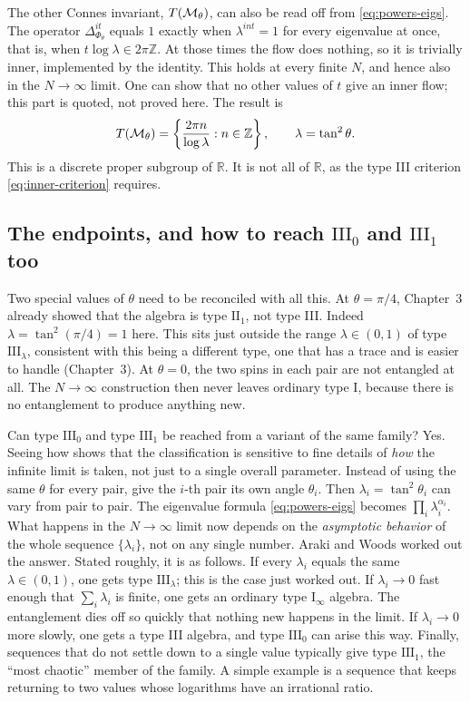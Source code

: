 The other Connes invariant, $T(\mathcal{M}_\theta)$, can also be read off from \eqref{eq:powers-eigs}. The operator
$\Delta_{\Phi_\theta}^{it}$ equals $1$ exactly when $\lambda^{int}=1$ for every eigenvalue at once, that is,
when $t\log\lambda\in2\pi\mathbb Z$. At those times the flow does nothing, so it is trivially inner,
implemented by the identity. This holds at every finite $N$, and hence also in the $N\to\infty$ limit. One can
show that no other values of $t$ give an inner flow; this part is quoted, not proved here. The result is
\[
T(\mathcal{M}_\theta) = \left\{\frac{2\pi n}{\log\lambda} : n\in\mathbb Z\right\}, \qquad \lambda=\tan^2\theta .
\]
This is a discrete proper subgroup of $\mathbb R$. It is not all of $\mathbb R$, as the type III criterion
\eqref{eq:inner-criterion} requires.

\subsection*{The endpoints, and how to reach $\mathrm{III}_0$ and $\mathrm{III}_1$ too}

Two special values of $\theta$ need to be reconciled with all this. At $\theta=\pi/4$, Chapter~3 already showed
that the algebra is type $\mathrm{II}_1$, not type III. Indeed $\lambda=\tan^2(\pi/4)=1$ here. This sits just
outside the range $\lambda\in(0,1)$ of type $\mathrm{III}_\lambda$, consistent with this being a different type,
one that has a trace and is easier to handle (Chapter~3). At $\theta=0$, the two spins in each pair are not
entangled at all. The $N\to\infty$ construction then never leaves ordinary type I, because there is no
entanglement to produce anything new.

Can type $\mathrm{III}_0$ and type $\mathrm{III}_1$ be reached from a variant of the same family? Yes. Seeing
how shows that the classification is sensitive to fine details of \emph{how} the infinite limit is taken, not
just to a single overall parameter. Instead of using the same $\theta$ for every pair, give the $i$-th pair its
own angle $\theta_i$. Then $\lambda_i=\tan^2\theta_i$ can vary from pair to pair. The eigenvalue formula
\eqref{eq:powers-eigs} becomes $\prod_i\lambda_i^{\alpha_i}$. What happens in the $N\to\infty$ limit now depends
on the \emph{asymptotic behavior} of the whole sequence $\{\lambda_i\}$, not on any single number. Araki and
Woods worked out the answer. Stated roughly, it is as follows. If every $\lambda_i$ equals the same
$\lambda\in(0,1)$, one gets type $\mathrm{III}_\lambda$; this is the case just worked out. If $\lambda_i\to0$
fast enough that $\sum_i\lambda_i$ is finite, one gets an ordinary type $\mathrm{I}_\infty$ algebra. The
entanglement dies off so quickly that nothing new happens in the limit. If $\lambda_i\to0$ more slowly, one
gets a type III algebra, and type $\mathrm{III}_0$ can arise this way. Finally, sequences that do not settle
down to a single value typically give type $\mathrm{III}_1$, the ``most chaotic'' member of the family. A
simple example is a sequence that keeps returning to two values whose logarithms have an irrational ratio.

